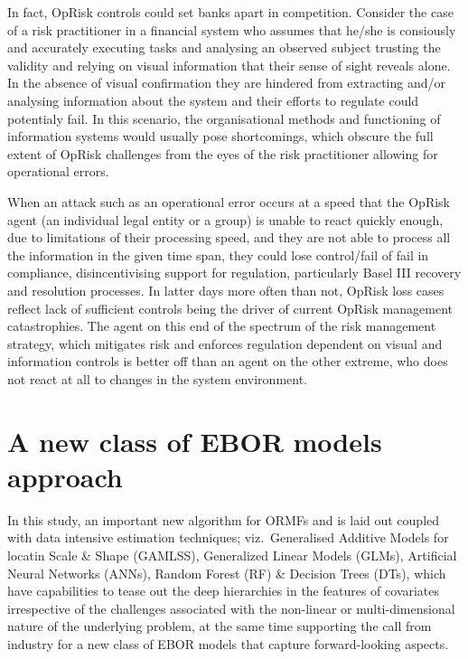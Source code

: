 \documentclass{DissertateUSU}
\begin{document}
In fact, OpRisk controls could set banks apart in competition. Consider
the case of a risk practitioner in a financial system who assumes that
he/she is consiously and accurately executing tasks and analysing an
observed subject trusting the validity and relying on visual information
that their sense of sight reveals alone. In the absence of visual
confirmation they are hindered from extracting and/or analysing
information about the system and their efforts to regulate could
potentialy fail. In this scenario, the organisational methods and
functioning of information systems would usually pose shortcomings,
which obscure the full extent of OpRisk challenges from the eyes of the
risk practitioner allowing for operational errors. \medskip

When an attack such as an operational error occurs at a speed that the
OpRisk agent (an individual legal entity or a group) is unable to react
quickly enough, due to limitations of their processing speed, and they
are not able to process all the information in the given time span, they
could lose control/fail of fail in compliance, disincentivising support
for regulation, particularly Basel III recovery and resolution
processes. In latter days more often than not, OpRisk loss cases reflect
lack of sufficient controls being the driver of current OpRisk
management catastrophies. The agent on this end of the spectrum of the
risk management strategy, which mitigates risk and enforces regulation
dependent on visual and information controls is better off than an agent
on the other extreme, who does not react at all to changes in the system
environment.

\section{A new class of EBOR models approach}
\label{sec:A new class of EBOR models approach}

In this study, an important new algorithm for ORMFs and is laid out
coupled with data intensive estimation techniques; viz.~Generalised
Additive Models for locatin Scale \& Shape (GAMLSS), Generalized Linear
Models (GLMs), Artificial Neural Networks (ANNs), Random Forest (RF) \&
Decision Trees (DTs), which have capabilities to tease out the deep
hierarchies in the features of covariates irrespective of the challenges
associated with the non-linear or multi-dimensional nature of the
underlying problem, at the same time supporting the call from industry
for a new class of EBOR models that capture forward-looking aspects.
\end{document}

